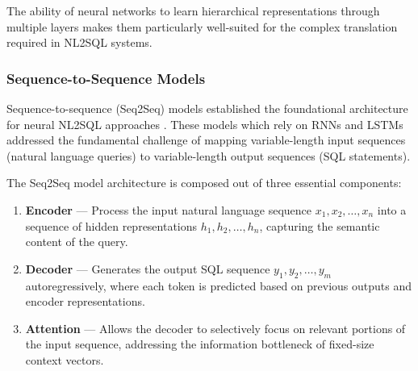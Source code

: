 The ability of neural networks to learn hierarchical representations through multiple layers makes them particularly well-suited for
the complex translation required in NL2SQL systems.

\subsubsection{Sequence-to-Sequence Models}

Sequence-to-sequence (Seq2Seq) models established the foundational architecture for neural NL2SQL approaches \citep{Seq2SQL, SQLNet}.
These models which rely on RNNs and LSTMs addressed the fundamental challenge of mapping variable-length input sequences (natural
language queries) to variable-length output sequences (SQL statements).

The Seq2Seq model architecture is composed out of three essential components:

\begin{enumerate}
    \item \textbf{Encoder} — Process the input natural language sequence $x_1, x_2, \ldots, x_n$ into a sequence of hidden
          representations $h_1, h_2, \ldots, h_n$, capturing the semantic content of the query.
    \item \textbf{Decoder} — Generates the output SQL sequence $y_1, y_2, \ldots, y_m$ autoregressively, where each token is
          predicted based on previous outputs and encoder representations.
    \item \textbf{Attention} — Allows the decoder to selectively focus on relevant portions of the input sequence, addressing
          the information bottleneck of fixed-size context vectors.
\end{enumerate}
